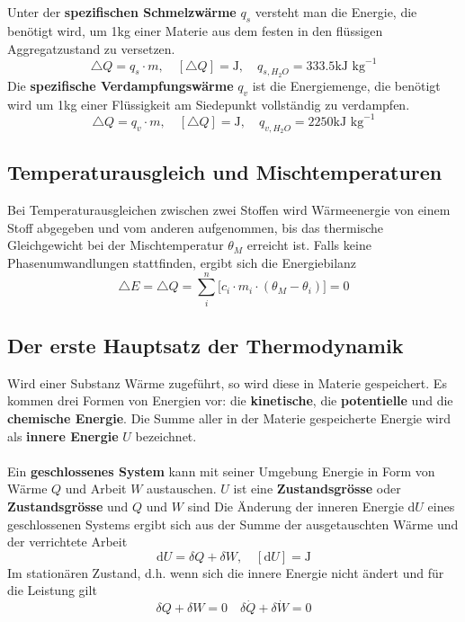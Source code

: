 \\\\
Unter der \textbf{spezifischen Schmelzwärme} $q_s$ versteht man die Energie, die benötigt wird, um 1kg einer Materie aus dem festen in den flüssigen Aggregatzustand zu versetzen.
\begin{equation}
\boxed{\triangle Q=q_s\cdot m,\quad [\triangle Q]=\text{J},\quad q_{s,H_2O}=333.5\text{kJ kg}^{-1}}
\end{equation}
Die \textbf{spezifische Verdampfungswärme} $q_v$ ist die Energiemenge, die benötigt wird um 1kg einer Flüssigkeit am Siedepunkt vollständig zu verdampfen.
\begin{equation}
\boxed{\triangle Q=q_v\cdot m,\quad [\triangle Q]=\text{J},\quad q_{v,H_2O}=2250\text{kJ kg}^{-1}}
\end{equation}
\subsection{Temperaturausgleich und Mischtemperaturen}
Bei Temperaturausgleichen zwischen zwei Stoffen wird Wärmeenergie von einem Stoff abgegeben und vom anderen aufgenommen, bis das thermische Gleichgewicht bei der Mischtemperatur $\theta_M$ erreicht ist. Falls keine Phasenumwandlungen stattfinden, ergibt sich die Energiebilanz
\begin{equation}
\boxed{\triangle E=\triangle Q=\displaystyle \sum_{i}^n\Big[c_i\cdot m_i\cdot \left(\theta_M-\theta_i\right)\Big]=0}
\end{equation}
\subsection{Der erste Hauptsatz der Thermodynamik}
Wird einer Substanz Wärme zugeführt, so wird diese in Materie gespeichert. Es kommen drei Formen von Energien vor: die \textbf{kinetische}, die \textbf{potentielle} und die \textbf{chemische Energie}. Die Summe aller in der Materie gespeicherte Energie wird als \textbf{innere Energie} $U$ bezeichnet.
\\\\
Ein \textbf{geschlossenes System} kann mit seiner Umgebung Energie in Form von Wärme $Q$ und Arbeit $W$ austauschen. $U$ ist eine \textbf{Zustandsgrösse} oder \textbf{Zustandsgrösse} und $Q$ und $W$ sind Die Änderung der inneren Energie $\text{d}U$ eines geschlossenen Systems ergibt sich aus der Summe der ausgetauschten Wärme und der verrichtete Arbeit
\begin{equation} 
\boxed{\text{d}U=\delta Q+\delta W,\quad [\text{d}U]=\text{J}}
\end{equation} 
Im stationären Zustand, d.h. wenn sich die innere Energie nicht ändert und für die Leistung gilt
\begin{equation}
\boxed{\delta Q+\delta W=0}\quad \boxed{\delta \dot{Q}+\delta \dot{W}=0}
\end{equation}
